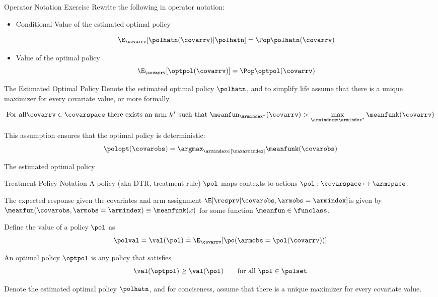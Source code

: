 \documentclass[aspectratio=169, professionalfonts]{beamer}
\begin{document}
\begin{frame}{Operator Notation Exercise}
	Rewrite the following in operator notation:
	\vfill
	\begin{itemize}

		\item Conditional Value of the estimated optimal policy

		      $$\E_{\covarrv}[\polhatn(\covarrv) \vert \polhatn] = \Pop \polhatn(\covarrv)$$

		\item Value of the optimal policy
		      $$\E_{\covarrv}[\optpol(\covarrv)] = \Pop \optpol(\covarrv)$$
	\end{itemize}
	\vfill

\end{frame}


\begin{frame}{The Estimated Optimal Policy}
	Denote the estimated optimal policy $\polhatn$, and to simplify life assume
	that there is a unique maximizer for every covariate value, or more formally

	$$\text{For all} \covarrv \in \covarspace \text{ there exists an arm }k^*
		\text{ such that } \meanfun_{\armindex^*}(\covarrv) > \max_{\armindex \neq
			\armindex^*} \meanfunk(\covarrv)$$

	\vfill \pause
	This assumption ensures that the optimal policy is deterministic:
	$$\polopt(\covarobs) = \argmax_{\armindex \in [\maxarmindex]}\meanfunk(\covarobs)$$

	The estimated optimal policy
\end{frame}

\begin{frame}{Treatment Policy Notation}
	A policy (aka DTR, treatment rule) $\pol$ maps contexts to actions $\pol: \covarspace \mapsto \armspace$.

	\vfill \pause
	The expected response given
	the covariates and arm assignment $\E[\resprv \vert \covarobs, \armobs =
			\armindex]$is given by $\meanfun(\covarobs, \armobs = \armindex) \equiv \meanfunk(x)$
	for some function $\meanfun \in \funclass$.

	\vfill \pause
	Define the value of a policy $\pol$ as
	\begin{equation}
		\polval = \val(\pol) \doteq \E_{\covarrv}[\po(\armobs = \pol(\covarrv))]
	\end{equation}

	\vfill \pause
	An optimal policy $\optpol$ is any policy that satisfies
	\begin{equation}
		\val(\optpol) \geq \val(\pol) \qquad \text{for all }\pol \in \polset
	\end{equation}

	\vfill \pause
	Denote the estimated optimal policy $\polhatn$, and for conciseness, assume
	that there is a unique maximizer for every covariate value.

\end{frame}



\appendix
\printbibliography
\end{document}
